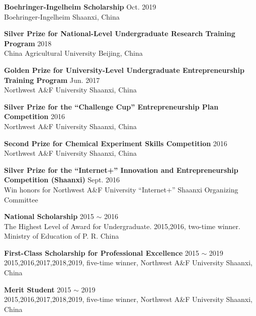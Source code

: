 \textbf{Boehringer-Ingelheim Scholarship} \hfill Oct. 2019 \\
{\small Boehringer-Ingelheim \hfill Shaanxi, China}
    
\vspace{4pt}

\textbf{Silver Prize for National-Level Undergraduate Research Training Program} \hfill 2018 \\
{\small China Agricultural University \hfill Beijing, China}

\vspace{4pt}

\textbf{Golden Prize for University-Level Undergraduate Entrepreneurship Training Program} \hfill Jun. 2017 \\
{\small Northwest A\&F University \hfill Shaanxi, China}

\vspace{4pt}

\textbf{Silver Prize for the ``Challenge Cup'' Entrepreneurship Plan Competition} \hfill 2016 \\
{\small Northwest A\&F University \hfill Shaanxi, China}

\vspace{4pt}

\textbf{Second Prize for Chemical Experiment Skills Competition} \hfill 2016 \\
{\small Northwest A\&F University \hfill Shaanxi, China}

\vspace{4pt}

\textbf{Silver Prize for the ``Internet+'' Innovation and Entrepreneurship Competition (Shaanxi)} \hfill Sept. 2016 \\
{\small Win honors for Northwest A\&F University \hfill ``Internet+'' Shaanxi Organizing Committee}

\vspace{4pt}

\textbf{National Scholarship} \hfill 2015 $\sim$ 2016 \\
{\small The Highest Level of Award for Undergraduate. 2015,2016, two-time winner. \hfill Ministry of Education of P. R. China}\\


\vspace{4pt}

\textbf{First-Class Scholarship for Professional Excellence} \hfill 2015 $\sim$ 2019 \\
{\small 2015,2016,2017,2018,2019, five-time winner, Northwest A\&F University \hfill Shaanxi, China}

\vspace{4pt}

\textbf{Merit Student} \hfill 2015 $\sim$ 2019 \\
{\small 2015,2016,2017,2018,2019, five-time winner, Northwest A\&F University \hfill Shaanxi, China}
